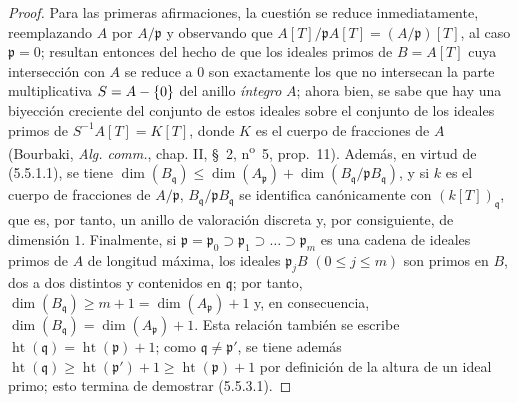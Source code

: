 \begin{proof}
Para las primeras afirmaciones, la cuestión se reduce inmediatamente, reemplazando
$A$ por $A/\mathfrak p$ y observando que
$A[T]/\mathfrak pA[T]=(A/\mathfrak p)[T]$, al caso $\mathfrak p=0$; resultan
entonces del hecho de que los ideales primos de $B=A[T]$ cuya intersección
con $A$ se reduce a $0$ son exactamente los que no intersecan la parte
multiplicativa $S=A-\{0\}$ del anillo \emph{íntegro} $A$; ahora bien, se sabe que hay
una biyección creciente del conjunto de estos ideales sobre el conjunto de los
ideales primos de $S^{-1}A[T]=K[T]$, donde $K$ es el cuerpo de fracciones de
$A$ (Bourbaki, \emph{Alg. comm.}, chap. II,
\S~2, n\textsuperscript{o}~5, prop.~11). Además, en virtud de (5.5.1.1), se
tiene
$\dim(B_{\mathfrak q})\leq\dim(A_{\mathfrak p})
+\dim(B_{\mathfrak q}/\mathfrak pB_{\mathfrak q})$,
y si $k$ es el cuerpo de fracciones de $A/\mathfrak p$,
$B_{\mathfrak q}/\mathfrak pB_{\mathfrak q}$ se identifica canónicamente con
$(k[T])_{\mathfrak q}$, que es, por tanto, un anillo de valoración discreta y,
por consiguiente, de dimensión $1$. Finalmente, si
$\mathfrak p=\mathfrak p_0\supset\mathfrak p_1\supset\ldots
\supset\mathfrak p_m$ es una cadena de ideales primos de $A$ de longitud
máxima, los ideales $\mathfrak p_jB$ $(0\leq j\leq m)$ son primos en
$B$, dos a dos distintos y contenidos en $\mathfrak q$; por tanto,
$\dim(B_{\mathfrak q})\geq m+1=\dim(A_{\mathfrak p})+1$ y, en consecuencia,
$\dim(B_{\mathfrak q})=\dim(A_{\mathfrak p})+1$. Esta relación también se
escribe $\operatorname{ht}(\mathfrak q)=\operatorname{ht}(\mathfrak p)+1$;
como $\mathfrak q\ne\mathfrak p'$, se tiene además
$\operatorname{ht}(\mathfrak q)\geq\operatorname{ht}(\mathfrak p')+1
\geq\operatorname{ht}(\mathfrak p)+1$ por definición de la altura de un
ideal primo; esto termina de demostrar (5.5.3.1).
\end{proof}
